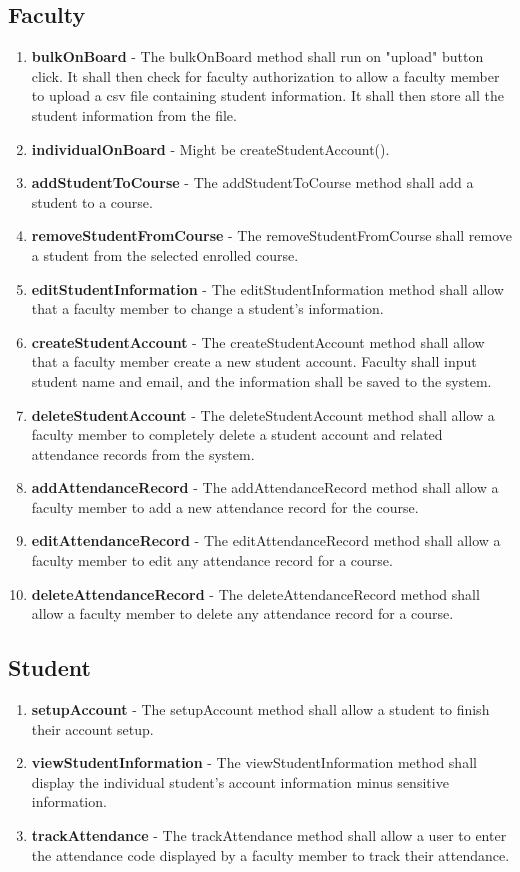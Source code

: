 \documentclass[letterpaper,12pt,oneside,listof=totoc]{scrreprt}
\begin{document}
\subsection{Faculty}
\begin{enumerate}
    \item \textbf{bulkOnBoard} - The bulkOnBoard method shall run on "upload" button click. It shall then check for faculty authorization to allow a faculty member to upload a csv file containing student information. It shall then store all the student information from the file.
    \item \textbf{individualOnBoard} - Might be createStudentAccount().
    \item \textbf{addStudentToCourse} - The addStudentToCourse method shall add a student to a course.
    \item \textbf{removeStudentFromCourse} - The removeStudentFromCourse shall remove a student from the selected enrolled course.
    \item \textbf{editStudentInformation} - The editStudentInformation method shall allow that a faculty member to change a student's information.
    \item \textbf{createStudentAccount} - The createStudentAccount method shall allow that a faculty member create a new student account. Faculty shall input student name and email, and the information shall be saved to the system.
    \item \textbf{deleteStudentAccount} - The deleteStudentAccount method shall allow a faculty member to completely delete a student account and related attendance records from the system.
    \item \textbf{addAttendanceRecord} - The addAttendanceRecord method shall allow a faculty member to add a new attendance record for the course.
    \item \textbf{editAttendanceRecord} - The editAttendanceRecord method shall allow a faculty member to edit any attendance record for a course.
    \item \textbf{deleteAttendanceRecord} - The deleteAttendanceRecord method shall allow a faculty member to delete any attendance record for a course.
\end{enumerate}

\subsection{Student}
\begin{enumerate}
    \item \textbf{setupAccount} - The setupAccount method shall allow a student to finish their account setup.
    \item \textbf{viewStudentInformation} - The viewStudentInformation method shall display the individual student's account information minus sensitive information.
    \item \textbf{trackAttendance} - The trackAttendance method shall allow a user to enter the attendance code displayed by a faculty member to track their attendance.
\end{enumerate}
\end{document}
